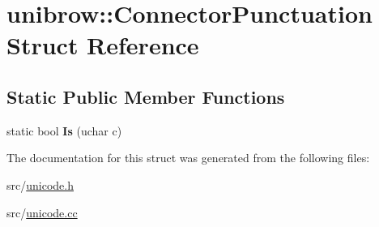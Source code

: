 \hypertarget{structunibrow_1_1_connector_punctuation}{}\section{unibrow\+:\+:Connector\+Punctuation Struct Reference}
\label{structunibrow_1_1_connector_punctuation}
\subsection*{Static Public Member Functions}
\begin{DoxyCompactItemize}
\item 
\hypertarget{structunibrow_1_1_connector_punctuation_a08c42338042c41ba9ff52c026eec8af2}{}static bool {\bfseries Is} (uchar c)\label{structunibrow_1_1_connector_punctuation_a08c42338042c41ba9ff52c026eec8af2}

\end{DoxyCompactItemize}


The documentation for this struct was generated from the following files\+:\begin{DoxyCompactItemize}
\item 
src/\hyperlink{unicode_8h}{unicode.\+h}\item 
src/\hyperlink{unicode_8cc}{unicode.\+cc}\end{DoxyCompactItemize}
